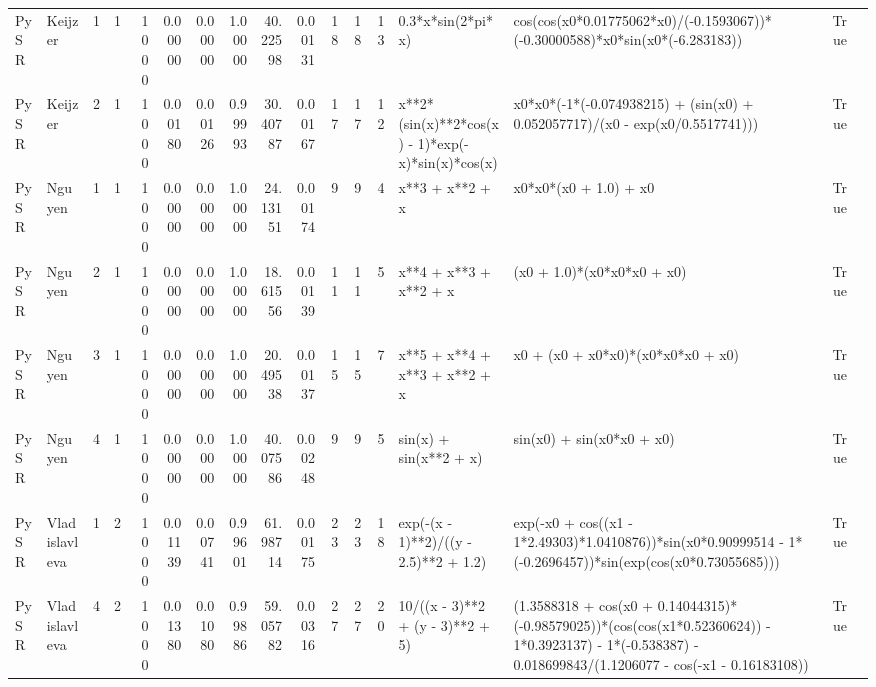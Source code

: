 \begin{tabular}{llrrrrrrrrrrrllrl}
PySR & Keijzer & 1 & 1 & 1000 & 0.00000 & 0.00000 & 1.00000 & 40.22598 & 0.00131 & 18 & 18 & 13 & 0.3*x*sin(2*pi*x) & cos(cos(x0*0.01775062*x0)/(-0.1593067))*(-0.30000588)*x0*sin(x0*(-6.283183)) & True &  \\
PySR & Keijzer & 2 & 1 & 1000 & 0.00180 & 0.00126 & 0.99993 & 30.40787 & 0.00167 & 17 & 17 & 12 & x**2*(sin(x)**2*cos(x) - 1)*exp(-x)*sin(x)*cos(x) & x0*x0*(-1*(-0.074938215) + (sin(x0) + 0.052057717)/(x0 - exp(x0/0.5517741))) & True &  \\
PySR & Nguyen & 1 & 1 & 1000 & 0.00000 & 0.00000 & 1.00000 & 24.13151 & 0.00174 & 9 & 9 & 4 & x**3 + x**2 + x & x0*x0*(x0 + 1.0) + x0 & True &  \\
PySR & Nguyen & 2 & 1 & 1000 & 0.00000 & 0.00000 & 1.00000 & 18.61556 & 0.00139 & 11 & 11 & 5 & x**4 + x**3 + x**2 + x & (x0 + 1.0)*(x0*x0*x0 + x0) & True &  \\
PySR & Nguyen & 3 & 1 & 1000 & 0.00000 & 0.00000 & 1.00000 & 20.49538 & 0.00137 & 15 & 15 & 7 & x**5 + x**4 + x**3 + x**2 + x & x0 + (x0 + x0*x0)*(x0*x0*x0 + x0) & True &  \\
PySR & Nguyen & 4 & 1 & 1000 & 0.00000 & 0.00000 & 1.00000 & 40.07586 & 0.00248 & 9 & 9 & 5 & sin(x) + sin(x**2 + x) & sin(x0) + sin(x0*x0 + x0) & True &  \\
PySR & Vladislavleva & 1 & 2 & 1000 & 0.01139 & 0.00741 & 0.99601 & 61.98714 & 0.00175 & 23 & 23 & 18 & exp(-(x - 1)**2)/((y - 2.5)**2 + 1.2) & exp(-x0 + cos((x1 - 1*2.49303)*1.0410876))*sin(x0*0.90999514 - 1*(-0.2696457))*sin(exp(cos(x0*0.73055685))) & True &  \\
PySR & Vladislavleva & 4 & 2 & 1000 & 0.01380 & 0.01080 & 0.99886 & 59.05782 & 0.00316 & 27 & 27 & 20 & 10/((x - 3)**2 + (y - 3)**2 + 5) & (1.3588318 + cos(x0 + 0.14044315)*(-0.98579025))*(cos(cos(x1*0.52360624)) - 1*0.3923137) - 1*(-0.538387) - 0.018699843/(1.1206077 - cos(-x1 - 0.16183108)) & True &  \\
\bottomrule
\end{tabular}
